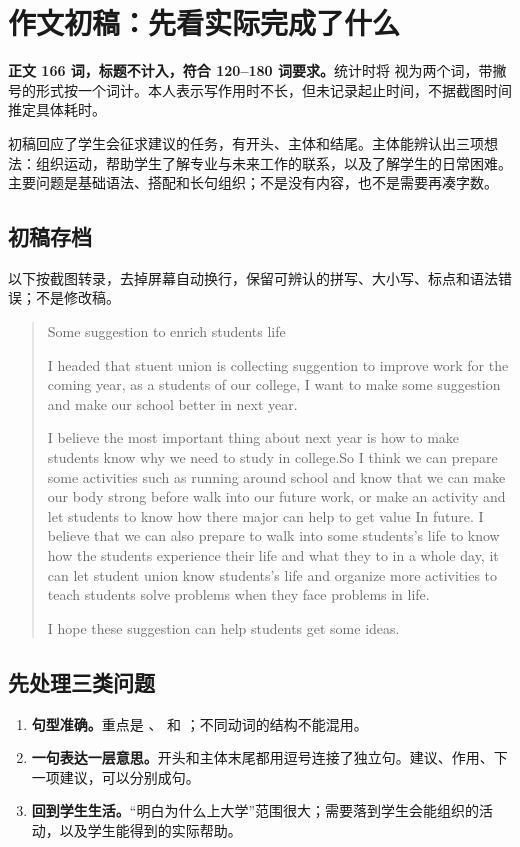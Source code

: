 \newpage
\section{作文初稿：先看实际完成了什么}
\textbf{正文 166 词，标题不计入，符合 120--180 词要求。}统计时将  视为两个词，带撇号的形式按一个词计。本人表示写作用时不长，但未记录起止时间，不据截图时间推定具体耗时。

初稿回应了学生会征求建议的任务，有开头、主体和结尾。主体能辨认出三项想法：组织运动，帮助学生了解专业与未来工作的联系，以及了解学生的日常困难。主要问题是基础语法、搭配和长句组织；不是没有内容，也不是需要再凑字数。

\subsection{初稿存档}
以下按截图转录，去掉屏幕自动换行，保留可辨认的拼写、大小写、标点和语法错误；不是修改稿。
\begin{quote}\small
Some suggestion to enrich students life

I headed that stuent union is collecting suggention to improve work for the coming year, as a students of our college, I want to make some suggestion and make our school better in next year.

I believe the most important thing about next year is how to make students know why we need to study in college.So I think we can prepare some activities such as running around school and know that we can make our body strong before walk into our future work, or make an activity and let students to know how there major can help to get value In future. I believe that we can also prepare to walk into some students’s life to know how the students experience their life and what they to in a whole day, it can let student union know students’s life and organize more activities to teach students solve problems when they face problems in life.

I hope these suggestion can help students get some ideas.
\end{quote}

\subsection{先处理三类问题}
\begin{enumerate}
\item \textbf{句型准确。}重点是 、 和 ；不同动词的结构不能混用。
\item \textbf{一句表达一层意思。}开头和主体末尾都用逗号连接了独立句。建议、作用、下一项建议，可以分别成句。
\item \textbf{回到学生生活。}“明白为什么上大学”范围很大；需要落到学生会能组织的活动，以及学生能得到的实际帮助。
\end{enumerate}


